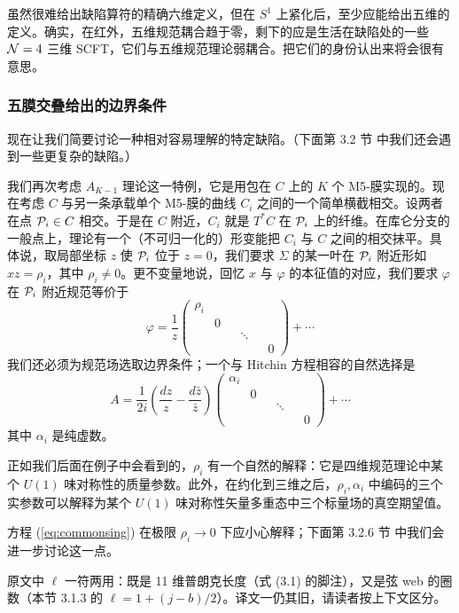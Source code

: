 虽然很难给出缺陷算符的精确六维定义，但在 $S^1$ 上紧化后，至少应能给出五维的定义。确实，在红外，五维规范耦合趋于零，剩下的应是生活在缺陷处的一些 $\mathcal{N}=4$ 三维 SCFT，它们与五维规范理论弱耦合。把它们的身份认出来将会很有意思。

\subsubsection{五膜交叠给出的边界条件} \label{sec:bc-intersection}

现在让我们简要讨论一种相对容易理解的特定缺陷。（下面第 3.2 节%
中我们还会遇到一些更复杂的缺陷。）

我们再次考虑 $A_{K-1}$ 理论这一特例，它是用包在 $C$ 上的 $K$ 个 M5-膜实现的。现在考虑 $C$ 与另一条承载单个 M5-膜的曲线 $C_i$ 之间的一个简单横截相交。设两者在点 $\mathcal{P}_i \in C$ 相交。于是在 $C$ 附近，$C_i$ 就是 $T^* C$ 在 $\mathcal{P}_i$ 上的纤维。在库仑分支的一般点上，理论有一个（不可归一化的）形变能把 $C_i$ 与 $C$ 之间的相交抹平。具体说，取局部坐标 $z$ 使 $\mathcal{P}_i$ 位于 $z = 0$，我们要求 $\Sigma$ 的某一叶在 $\mathcal{P}_i$ 附近形如 $xz = \rho_i$，其中 $\rho_i \neq 0$。更不变量地说，回忆 $x$ 与 $\varphi$ 的本征值的对应，我们要求 $\varphi$ 在 $\mathcal{P}_i$ 附近规范等价于
\begin{equation}\label{eq:commonsing}
\varphi = \frac{ 1 }{z} \begin{pmatrix} \rho_i & & & & & \\ & 0 & & & & \\ & & & \ddots & & \\ & & & & & 0 \end{pmatrix}  + \cdots
\end{equation}
我们还必须为规范场选取边界条件；一个与 Hitchin 方程相容的自然选择是
\begin{equation}\label{eq:Aboundryc}
A =\frac{1}{2i}  \left(\frac{d z}{z} -
\frac{d \bar z}{\bar z}\right) \begin{pmatrix} \alpha_i & & & & & \\ & 0 & & & & \\ & & & \ddots & & \\ & & & & & 0 \end{pmatrix} + \cdots
\end{equation}
其中 $\alpha_i$ 是纯虚数。

正如我们后面在例子中会看到的，$\rho_i$ 有一个自然的解释：它是四维规范理论中某个 $U(1)$ 味对称性的质量参数。此外，在约化到三维之后，$\rho_i, \alpha_i$ 中编码的三个实参数可以解释为某个 $U(1)$ 味对称性矢量多重态中三个标量场的真空期望值。

方程 (\ref{eq:commonsing}) 在极限 $\rho_i \to 0$ 下应小心解释；下面第 3.2.6 节%
中我们会进一步讨论这一点。

\begin{yizhu}
原文中 $\ell$ 一符两用：既是 11 维普朗克长度（式 (3.1) 的脚注），又是弦 web 的圈数（本节 3.1.3 的 $\ell = 1+(j-b)/2$）。译文一仍其旧，请读者按上下文区分。
\end{yizhu}
